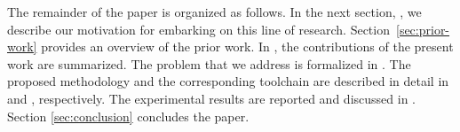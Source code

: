 The remainder of the paper is organized as follows. In the next section,
, we describe our motivation for embarking on this line of
research. Section~\ref{sec:prior-work} provides an overview of the prior work.
In , the contributions of the present work are summarized.
The problem that we address is formalized in . The
proposed methodology and the corresponding toolchain are described in detail in
 and , respectively. The experimental results
are reported and discussed in . Section
\ref{sec:conclusion} concludes the paper.
